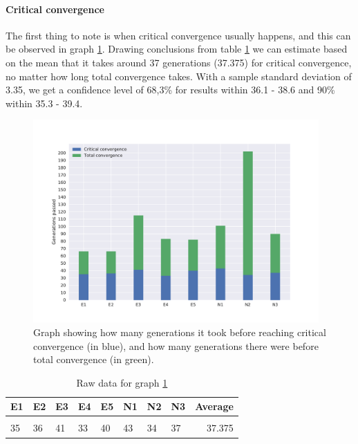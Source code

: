 \documentclass[a4paper,english]{report}
\begin{document}
	\paragraph{Critical convergence} The first thing to note is when critical convergence usually happens, and this can be observed in graph \ref{fig:criticalconv}. Drawing conclusions from table \ref{table:criticalconv} we can estimate based on the mean that it takes around 37 generations (37.375) for critical convergence, no matter how long total convergence takes. With a sample standard deviation of 3.35, we get a confidence level of 68,3\% for results within 36.1 - 38.6 and 90\% within 35.3 - 39.4.
	\begin{figure}[H]
		\centering
		\includegraphics[width=310pt]{criticalcon1}
		\caption{Graph showing how many generations it took before reaching critical convergence (in blue), and how many generations there were before total convergence (in green).}
		\label{fig:criticalconv}
	\end{figure}
	\begin{table}[H]
		\centering
		\caption{Raw data for graph \ref{fig:criticalconv}}
		\label{table:criticalconv}
		\begin{tabular}{llllllll|r}
			\\
			\textbf{E1} & \textbf{E2} & \textbf{E3} & \textbf{E4} & \textbf{E5} & \textbf{N1} & \textbf{N2} & \textbf{N3} & \textbf{Average} \\ \hline \\
			35 & 36 & 41 & 33 & 40 & 43 & 34 & 37 & 37.375 \\
		\end{tabular}
	\end{table}
	\pagebreak
\end{document}
